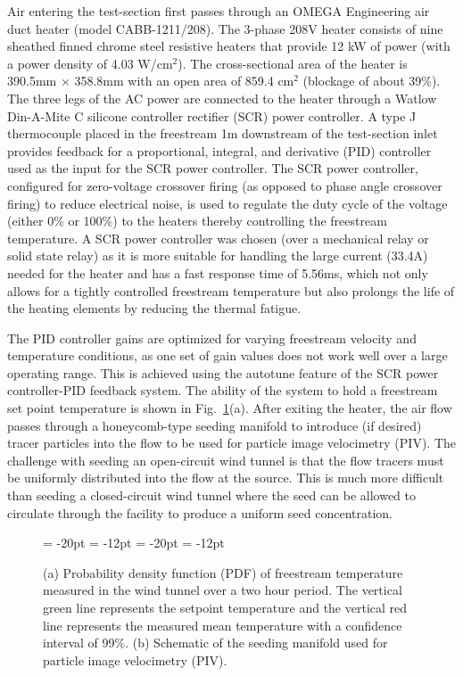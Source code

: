Air entering the test-section first passes through an OMEGA Engineering air duct heater (model CABB-1211/208). 
The 3-phase 208V heater consists of nine sheathed finned chrome steel resistive heaters that provide 12 kW of power (with a power density of 4.03 W/cm$^2$). 
The cross-sectional area of the heater is 390.5mm $\times$ 358.8mm with an open area of 859.4 cm$^2$ (blockage of about 39\%). 
The three legs of the AC power are connected to the heater through a Watlow Din-A-Mite C silicone controller rectifier (SCR) power controller. 
A type J thermocouple placed in the freestream 1m downstream of the test-section inlet provides feedback for a proportional, integral, and derivative (PID) controller used as the input for the SCR power controller. 
The SCR power controller, configured for zero-voltage crossover firing (as opposed to phase angle crossover firing) to reduce electrical noise, is used to regulate the duty cycle of the voltage (either 0\% or 100\%) to the heaters thereby controlling the freestream temperature. 
A SCR power controller was chosen (over a mechanical relay or solid state relay) as it is more suitable for handling the large current (33.4A) needed for the heater and has a fast response time of 5.56ms, which not only allows for a tightly controlled freestream temperature but also prolongs the life of the heating elements by reducing the thermal fatigue.

The PID controller gains are optimized for varying freestream velocity and temperature conditions, as one set of gain values does not work well over a large operating range. 
This is achieved using the autotune feature of the SCR power controller-PID feedback system. 
The ability of the system to hold a freestream set point temperature is shown in Fig.~\ref{fig:inlet}(a). 
After exiting the heater, the air flow passes through a honeycomb-type seeding manifold to introduce (if desired) tracer particles into the flow to be used for particle image velocimetry (PIV).
The challenge with seeding an open-circuit wind tunnel is that the flow tracers must be uniformly distributed into the flow at the source. 
This is much more difficult than seeding a closed-circuit wind tunnel where the seed can be allowed to circulate through the facility to produce a uniform seed concentration. 

\begin{figure}[t!]
  \begin{center}
  {\subfigcapskip = -20pt \subfigcapmargin = -12pt }
   {\subfigcapskip = -20pt \subfigcapmargin = -12pt  }
  \end{center}
 \caption{\label{fig:Virk_model} \footnotesize (a) Probability density function (PDF) of freestream temperature measured in the wind tunnel over a two hour period. The vertical green line represents the setpoint temperature and the vertical red line represents the measured mean temperature with a confidence interval of 99\%. (b) Schematic of the seeding manifold used for particle image velocimetry (PIV).}  
\label{fig:inlet}
\end{figure}

